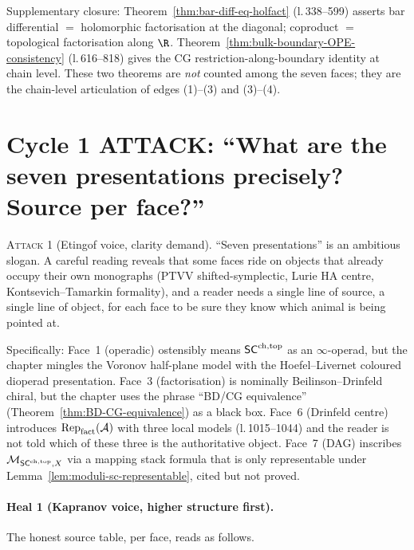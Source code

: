 Supplementary closure: Theorem~\ref*{thm:bar-diff-eq-holfact} (l.\,338--599) asserts bar differential $=$ holomorphic factorisation at the diagonal; coproduct $=$ topological factorisation along $\R$. Theorem~\ref*{thm:bulk-boundary-OPE-consistency} (l.\,616--818) gives the CG restriction-along-boundary identity at chain level. These two theorems are \emph{not} counted among the seven faces; they are the chain-level articulation of edges (1)--(3) and (3)--(4).

\section{Cycle 1 ATTACK: ``What are the seven presentations precisely? Source per face?''}

\textsc{Attack 1} (Etingof voice, clarity demand). ``Seven presentations'' is an ambitious slogan. A careful reading reveals that some faces ride on objects that already occupy their own monographs (PTVV shifted-symplectic, Lurie $\mathrm{HA}$ centre, Kontsevich--Tamarkin formality), and a reader needs a single line of source, a single line of object, for each face to be sure they know which animal is being pointed at.

Specifically: Face~1 (operadic) ostensibly means $\mathsf{SC}^{\mathrm{ch},\mathrm{top}}$ as an $\infty$-operad, but the chapter mingles the Voronov half-plane model with the Hoefel--Livernet coloured dioperad presentation. Face~3 (factorisation) is nominally Beilinson--Drinfeld chiral, but the chapter uses the phrase ``BD/CG equivalence'' (Theorem~\ref*{thm:BD-CG-equivalence}) as a black box. Face~6 (Drinfeld centre) introduces $\mathrm{Rep}_{\mathrm{fact}}(\mathcal{A})$ with three local models (l.\,1015--1044) and the reader is not told which of these three is the authoritative object. Face~7 (DAG) inscribes $\mathcal{M}_{\mathsf{SC}^{\mathrm{ch},\mathrm{top}}, X}$ via a mapping stack formula that is only representable under Lemma~\ref*{lem:moduli-sc-representable}, cited but not proved.

\paragraph{Heal 1 (Kapranov voice, higher structure first).} The honest source table, per face, reads as follows.

